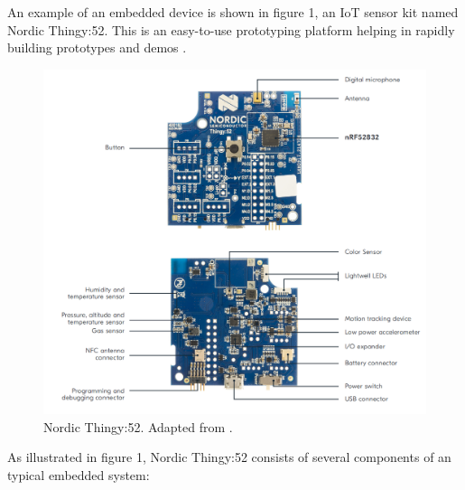 An example of an embedded device is shown in figure 1, an IoT sensor kit named
Nordic Thingy:52. This is an easy-to-use prototyping platform helping in rapidly
building prototypes and demos \cite{Thingy19}. 
\begin{figure}[H]
    \centering
    \includegraphics[scale=1.6]{figure/figure01_thingy_52.png}
    \caption{Nordic Thingy:52. Adapted from \cite{Thingy19}.}
\end{figure}
\justify
As illustrated in figure 1, Nordic Thingy:52 consists of several components of an
typical embedded system:
